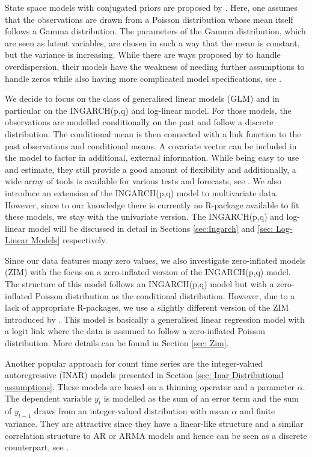 State space models with conjugated priors are proposed by \textcite{Harvey:1989}. Here, one assumes that the observations are drawn from a Poisson distribution whose mean itself follows a Gamma distribution. The parameters of the Gamma distribution, which are seen as latent variables, are chosen in such a way that the mean is constant, but the variance is increasing. While there are ways proposed by \textcite{Qaqish:1988} to handle overdispersion, their models have the weakness of needing further assumptions to handle zeros while also having more complicated model specifications, see \textcite{Heinen:2003}.

We decide to focus on the class of generalised linear models (GLM) and in particular on the INGARCH(p,q) and log-linear model. For those models, the observations are modelled conditionally on the past and follow a discrete distribution. The conditional mean is then connected with a link function to the past observations and conditional means. A covariate vector can be included in the model to factor in additional, external information. While being easy to use and estimate, they still provide a good amount of flexibility and additionally, a wide array of tools is available for various tests and forecasts, see \textcite{Liboschik:2016}. We also introduce an extension of the INGARCH(p,q) model to multivariate data. However, since to our knowledge there is currently no R-package available to fit these models, we stay with the univariate version. The INGARCH(p,q) and log-linear model will be discussed in detail in Sections \ref{sec:Ingarch} and \ref{sec: Log-Linear Models} respectively.

Since our data features many zero values, we also investigate zero-inflated models (ZIM) with the focus on a zero-inflated version of the INGARCH(p,q) model. The structure of this model follows an INGARCH(p,q) model but with a zero-inflated Poisson distribution as the conditional distribution. However, due to a lack of appropriate R-packages, we use a slightly different version of the ZIM introduced by \textcite{Lambert:1992}. This model is basically a generalised linear regression model with a logit link where the data is assumed to follow a zero-inflated Poisson distribution. More details can be found in Section \ref{sec: Zim}.

Another popular approach for count time series are the integer-valued autoregressive (INAR) models presented in Section \ref{sec: Inar Distributional assumptions}. These models are based on a thinning operator and a parameter $\alpha$. The dependent variable $y_t$ is modelled as the sum of an error term and the sum of $y_{t-1}$ draws from an integer-valued distribution with mean $\alpha$ and finite variance. They are attractive since they have a linear-like structure and a similar correlation structure to AR or ARMA models and hence can be seen as a discrete counterpart, see \textcite{Heinen:2003}. 

